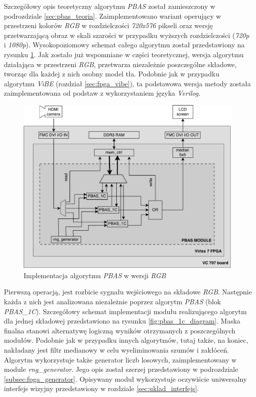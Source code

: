 Szczegółowy opis teoretyczny algorytmu \textit{PBAS} został zamieszczony w podrozdziale \ref{sec:pbas_teoria}. 
Zaimplementowano wariant operujący w przestrzeni kolorów \textit{RGB} w rozdzielczości \textit{720x576} pikseli oraz wersję przetwarzającą obraz w skali szarości w przypadku wyższych rozdzielczości (\textit{720p} i \textit{1080p}). 
Wysokopoziomowy schemat całego algorytmu został przedstawiony na rysunku \ref{fig:pbas_diagram}. 
Jak zostało już wspomniane w części teoretycznej, wersja algorytmu działająca w przestrzeni \textit{RGB}, przetwarza niezależnie poszczególne składowe, tworząc dla każdej z nich osobny model tła. 
Podobnie jak w przypadku algorytmu \textit{ViBE} (rozdział \ref{sec:fpga_vibe}), ta podstawowa wersja metody została zaimplementowana od podstaw z wykorzystaniem języka \textit{Verilog}. 
	
	\begin{figure}[h!]
		\centering
		\includegraphics[scale=0.6]{img/4/pbas.pdf}
		\caption{Implementacja algorytmu \textit{PBAS} w wersji \textit{RGB}}
		\label{fig:pbas_diagram}
	\end{figure}

Pierwszą operacją, jest rozbicie sygnału wejściowego na składowe \textit{RGB}. 
Następnie każda z nich jest analizowana niezależnie poprzez algorytm \textit{PBAS} (blok \textit{PBAS\_1C}). 
Szczegółowy schemat implementacji modułu realizującego algorytm dla jednej składowej przedstawiono na rysunku \ref{fig:pbas_1c_diagram}. 
Maska finalna stanowi alternatywę logiczną wyników otrzymanych z poszczególnych modułów. 
Podobnie jak w przypadku innych algorytmów, tutaj także, na koniec, nakładany jest filtr medianowy w celu wyeliminowania szumów i zakłóceń.
Algorytm wykorzystuje także generator liczb losowych, zaimplementowany w module \textit{rng\_generator}. 
Jego opis został szerzej przedstawiony w podrozdziale \ref{subsec:fpga_generator}. 
Opisywany moduł wykorzystuje oczywiście uniwersalny interfejs wizyjny przedstawiony w rozdziale \ref{sec:uklad_interfejs}. 
	
